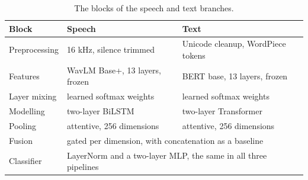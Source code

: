 \documentclass[11pt,a4paper]{article}
\begin{document}
\begin{table}[htbp]
\centering\small
\caption{The blocks of the speech and text branches.}
\label{tab:blocks}
\begin{tabular}{lll}
\toprule
Block & Speech & Text \\
\midrule
Preprocessing & 16 kHz, silence trimmed & Unicode cleanup, WordPiece tokens \\
Features & WavLM Base+, 13 layers, frozen & BERT base, 13 layers, frozen \\
Layer mixing & learned softmax weights & learned softmax weights \\
Modelling & two-layer BiLSTM & two-layer Transformer \\
Pooling & attentive, 256 dimensions & attentive, 256 dimensions \\
\midrule
Fusion & \multicolumn{2}{l}{gated per dimension, with concatenation as a baseline} \\
Classifier & \multicolumn{2}{l}{LayerNorm and a two-layer MLP, the same in all three pipelines} \\
\bottomrule
\end{tabular}
\end{table}
\end{document}

